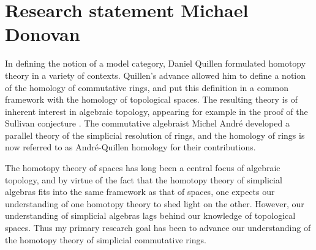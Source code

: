 \documentclass[11pt]{article}
\theoremstyle{plain}
\begin{document}




\section*{\huge Research statement \hfill\normalsize Michael Donovan} 

In defining the notion of a model category, Daniel Quillen \cite{QuillenHomAlg.pdf} formulated homotopy theory in a variety of contexts. Quillen's advance allowed him to define a notion of the homology of commutative rings, and put this definition in a common framework with the homology of topological spaces. The resulting theory is of inherent interest in algebraic topology, appearing for example in the proof of the Sullivan conjecture \cite{MillerSullivanConjecture.pdf}. The commutative algebraist Michel Andr\'e developed a parallel theory of the simplicial resolution of rings, and the homology of rings is now referred to as Andr\'e-Quillen homology for their contributions. 
%
%
%
%
%
%
%
%
%

The homotopy theory of spaces has long been a central focus of algebraic topology, and by virtue of the fact that the homotopy theory of simplicial algebras fits into the same framework as that of spaces, one expects our understanding of one homotopy theory to shed light on the other. However, our understanding of simplicial algebras lags behind our knowledge of topological spaces. Thus my primary research goal has been to advance our understanding of the homotopy theory of simplicial commutative rings. 
\end{document}
